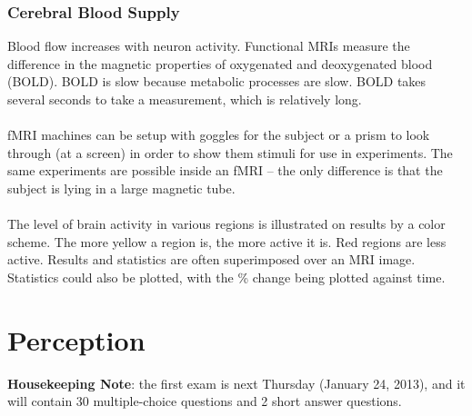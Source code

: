 \documentclass[]{article}
\newcommand{\lecture}[1]{\marginpar{{\footnotesize $\leftarrow$ \underline{#1}}}}
\begin{document}
			\subsubsection{Cerebral Blood Supply}
				Blood flow increases with neuron activity. Functional MRIs measure the difference in the magnetic properties of oxygenated and deoxygenated blood (BOLD). BOLD is slow because metabolic processes are slow. BOLD takes several seconds to take a measurement, which is relatively long.
				\\ \\
				fMRI machines can be setup with goggles for the subject or a prism to look through (at a screen) in order to show them stimuli for use in experiments. The same experiments are possible inside an fMRI -- the only difference is that the subject is lying in a large magnetic tube.
				\\ \\
				The level of brain activity in various regions is illustrated on results by a color scheme. The more yellow a region is, the more active it is. Red regions are less active. Results and statistics are often superimposed over an MRI image. Statistics could also be plotted, with the \% change being plotted against time.
	\section{Perception} \lecture{January 17, 2013}
		\textbf{Housekeeping Note}: the first exam is next Thursday (January 24, 2013), and it will contain 30 multiple-choice questions and 2 short answer questions.
\end{document}
